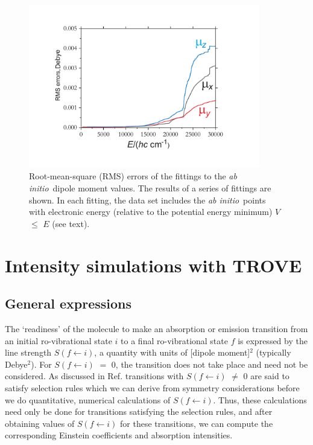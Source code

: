 \documentclass{achemso}
\newcommand{\3}{$_{3}$}
\newcommand{\ai}{\textit{ab initio}}
\begin{document}
\begin{figure}[h]
\begin{center}
\caption{\label{fig:rms-DMS} Root-mean-square (RMS) errors of the fittings to the \ai\ dipole moment values.
The results of a series of fittings are shown. In each fitting, the data set includes the \ai\ points with
electronic energy (relative to the potential energy minimum) $V$ $\leqslant$ $E$ (see text).}
\includegraphics[width=0.9\textwidth]{CH3_RMS_dms.pdf}
\end{center}
\end{figure}

\section{Intensity simulations with TROVE} \label{sec:simulat:range}

\subsection{General expressions} \label{subs:General-formulas}

The `readiness' of the molecule to make an absorption or emission transition from an initial ro-vibrational state $i$ to a final ro-vibrational state $f$ is expressed by the  line strength\cite{dipole05,mss,fms}  $S(f\leftarrow i)$, a  quantity with units of [dipole moment]$^2$ (typically Debye$^2$). For $S(f\leftarrow i)$ $=$ 0, the transition does not take place and need not be considered. As discussed in Ref. transitions with $S(f\leftarrow i)$ $\ne$ 0 are said to satisfy selection rules which we can derive from symmetry considerations before we do quantitative, numerical calculations of $S(f\leftarrow i)$. Thus, these calculations need only be done for transitions satisfying the selection rules, and after obtaining values of $S(f\leftarrow i)$ for these transitions, we can compute the corresponding  Einstein coefficients
and absorption intensities.
\end{document}
